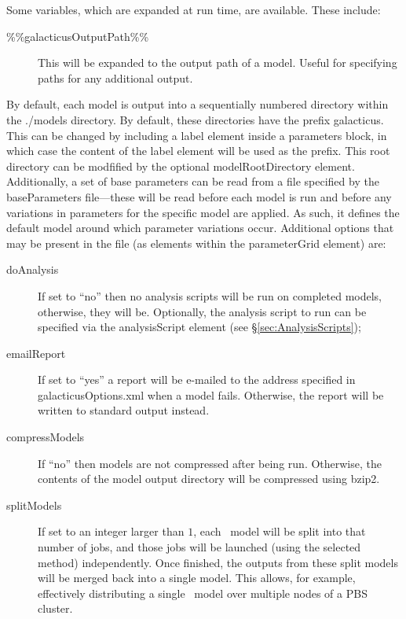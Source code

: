 Some variables, which are expanded at run time, are available. These include:
\begin{description}
\item [{\normalfont \ttfamily \%\%galacticusOutputPath\%\%}] This will be expanded to the output path of a model. Useful for specifying paths for any additional output.
\end{description}

By default, each model is output into a sequentially numbered directory within the {\normalfont \ttfamily ./models} directory. By default, these directories have the prefix {\normalfont \ttfamily galacticus}. This can be changed by including a {\normalfont \ttfamily label} element inside a {\normalfont \ttfamily parameters} block, in which case the content of the {\normalfont \ttfamily label} element will be used as the prefix. This root directory can be modfified by the optional {\normalfont \ttfamily modelRootDirectory} element. Additionally, a set of base parameters can be read from a file specified by the {\normalfont \ttfamily baseParameters} file---these will be read before each model is run and before any variations in parameters for the specific model are applied. As such, it defines the default model around which parameter variations occur. Additional options that may be present in the file (as elements within the {\normalfont \ttfamily parameterGrid} element) are:
\begin{description}
\item[{\normalfont \ttfamily doAnalysis}]If set to ``no'' then no analysis scripts will be run on completed models, otherwise, they will be. Optionally, the analysis script to run can be specified via the {\normalfont \ttfamily analysisScript} element (see \S\ref{sec:AnalysisScripts});
\item[{\normalfont \ttfamily emailReport}] If set to ``yes'' a report will be e-mailed to the address specified in {\normalfont \ttfamily galacticusOptions.xml} when a model fails. Otherwise, the report will be written to standard output instead.
\item[{\normalfont \ttfamily compressModels}] If ``no'' then models are not compressed after being run. Otherwise, the contents of the model output directory will be compressed using {\normalfont \ttfamily bzip2}.
\item[{\normalfont \ttfamily splitModels}] If set to an integer larger than $1$, each \glc\ model will be split into that number of jobs, and those jobs will be launched (using the selected method) independently. Once finished, the outputs from these split models will be merged back into a single model. This allows, for example, effectively distributing a single \glc\ model over multiple nodes of a PBS cluster.
\end{description}

